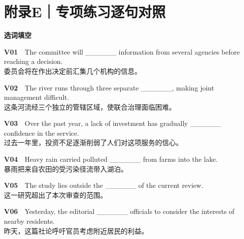 \documentclass[a4paper,11pt,openany]{report}
\newcommand{\zhline}[1]{{\CJKsf\color{bodygrey}#1}}
\begin{document}
\section{附录E｜专项练习逐句对照}\label{ux9644ux5f55eux4e13ux9879ux7ec3ux4e60ux9010ux53e5ux5bf9ux7167}

\textbf{选词填空}

\begin{samepage}
\textbf{V01}　The committee will \_\_\_\_\_\_ information from several agencies before reaching a decision.\\
\zhline{委员会将在作出决定前汇集几个机构的信息。}
\par\end{samepage}

\begin{samepage}
\textbf{V02}　The river runs through three separate \_\_\_\_\_\_, making joint management difficult.\\
\zhline{这条河流经三个独立的管辖区域，使联合治理面临困难。}
\par\end{samepage}

\begin{samepage}
\textbf{V03}　Over the past year, a lack of investment has gradually \_\_\_\_\_\_ confidence in the service.\\
\zhline{过去一年里，投资不足逐渐削弱了人们对这项服务的信心。}
\par\end{samepage}

\begin{samepage}
\textbf{V04}　Heavy rain carried polluted \_\_\_\_\_\_ from farms into the lake.\\
\zhline{暴雨把来自农田的受污染径流带入湖泊。}
\par\end{samepage}

\begin{samepage}
\textbf{V05}　The study lies outside the \_\_\_\_\_\_ of the current review.\\
\zhline{这一研究超出了本次审查的范围。}
\par\end{samepage}

\begin{samepage}
\textbf{V06}　Yesterday, the editorial \_\_\_\_\_\_ officials to consider the interests of nearby residents.\\
\zhline{昨天，这篇社论呼吁官员考虑附近居民的利益。}
\par\end{samepage}
\end{document}
